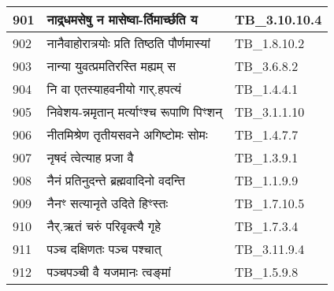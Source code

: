\documentclass[17pt]{extarticle}
\begin{document}
\begin{longtable}{||p{0.4in}||p{4.9in}||p{0.9in}||}
    \hline
        
    901 & नाद्र्धमसेषु न मासेष्वा{-}र्तिमार्च्छति य & TB\_3.10.10.4       \\
    
    \hline
        
    902 & नानैवाहोरात्रयोः प्रति तिष्ठति पौर्णमास्यां & TB\_1.8.10.2       \\
    
    \hline
        
    903 & नान्या युवत्प्रमतिरस्ति मह्यम् स & TB\_3.6.8.2       \\
    
    \hline
        
    904 & नि वा एतस्याहवनीयो गार्.हपत्यं & TB\_1.4.4.1       \\
    
    \hline
        
    905 & निवेशय{-}न्नमृतान् मर्त्याꣳश्च रूपाणि पिꣳशन् & TB\_3.1.1.10       \\
    
    \hline
        
    906 & नीतमिश्रेण तृतीयसवने अगिष्टोमः सोमः & TB\_1.4.7.7       \\
    
    \hline
        
    907 & नृषदं त्वेत्याह प्रजा वै & TB\_1.3.9.1       \\
    
    \hline
        
    908 & नैनं प्रतिनुदन्ते ब्रह्मवादिनो वदन्ति & TB\_1.1.9.9       \\
    
    \hline
        
    909 & नैनꣳ सत्यानृते उदिते हिꣳस्तः & TB\_1.7.10.5       \\
    
    \hline
        
    910 & नैर्.ऋतं चरुं परिवृक्त्यै गृहे & TB\_1.7.3.4       \\
    
    \hline
        
    911 & पञ्च दक्षिणतः पञ्च पश्चात् & TB\_3.11.9.4       \\
    
    \hline
        
    912 & पञ्चपञ्ची वै यजमानः त्वङ्मां & TB\_1.5.9.8       \\
    
    \hline
        

\end{longtable}
\end{document}
